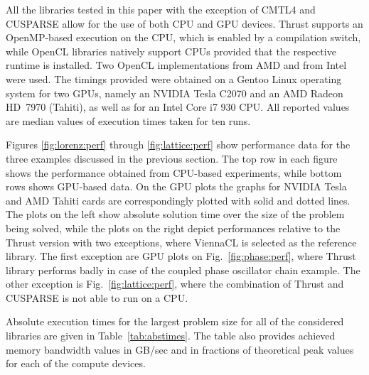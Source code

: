 \documentclass[final]{siamltex}
\newcommand{\figref}[1]{Fig.~\ref{#1}}
\begin{document}
All the libraries tested in this paper with the exception of CMTL4 and CUSPARSE
allow for the use of both CPU and GPU devices.  Thrust supports an OpenMP-based
execution on the CPU, which is enabled by a compilation switch, while OpenCL
libraries natively support CPUs provided that the respective runtime is
installed. Two OpenCL implementations from AMD and from Intel were used.  The
timings provided were obtained on a Gentoo Linux operating system for two GPUs,
namely an NVIDIA Tesla C2070 and an AMD Radeon HD~7970 (Tahiti), as well as for
an Intel Core i7 930 CPU.  All reported values are median values of execution
times taken for ten runs.

Figures \ref{fig:lorenz:perf} through \ref{fig:lattice:perf} show performance
data for the three examples discussed in the previous section.  The top row in
each figure shows the performance obtained from CPU-based experiments, while
bottom rows shows GPU-based data. On the GPU plots the graphs for NVIDIA Tesla
and AMD Tahiti cards are correspondingly plotted with solid and dotted lines.
The plots on the left show absolute solution time over the size of the problem
being solved, while the plots on the right depict performances relative to the
Thrust version with two exceptions, where ViennaCL is selected as the reference
library. The first exception are GPU plots on \figref{fig:phase:perf}, where
Thrust library performs badly in case of the coupled phase oscillator chain
example. The other exception is \figref{fig:lattice:perf}, where the
combination of Thrust and CUSPARSE is not able to run on a CPU. 

Absolute execution times for the largest problem size for all of the considered
libraries are given in Table~\ref{tab:abstimes}. The table also provides
achieved memory bandwidth values in GB/sec and in fractions of theoretical peak
values for each of the compute devices.
\end{document}
